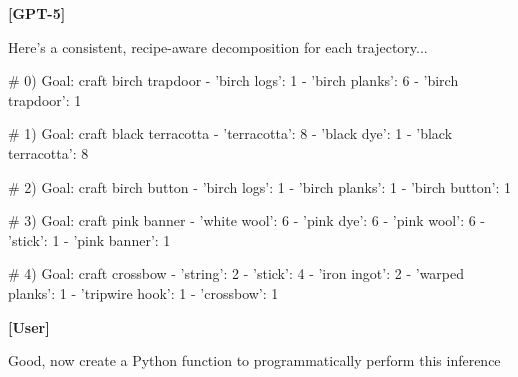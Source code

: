 \textbf{[GPT-5]}
\begin{ModelTurn}
Here’s a consistent, recipe-aware decomposition for each trajectory...

# 0) Goal: craft birch trapdoor
- {'birch logs': 1}
- {'birch planks': 6}
- {'birch trapdoor': 1}

# 1) Goal: craft black terracotta
- {'terracotta': 8}
- {'black dye': 1}
- {'black terracotta': 8}

# 2) Goal: craft birch button
- {'birch logs': 1}
- {'birch planks': 1}
- {'birch button': 1}

# 3) Goal: craft pink banner
- {'white wool': 6}
- {'pink dye': 6}
- {'pink wool': 6}
- {'stick': 1}
- {'pink banner': 1}

# 4) Goal: craft crossbow
- {'string': 2}
- {'stick': 4}
- {'iron ingot': 2}
- {'warped planks': 1}
- {'tripwire hook': 1}
- {'crossbow': 1}
\end{ModelTurn}

\textbf{[User]}
\begin{UserTurn}
Good, now create a Python function to programmatically perform this inference
\end{UserTurn}

